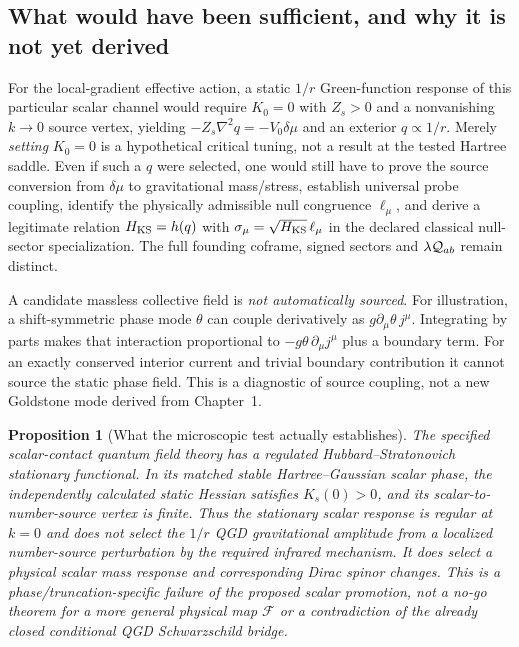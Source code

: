 \documentclass[11pt,a4paper]{article}
\newtheorem{proposition}{Proposition}[section]\newtheorem{lemma}[proposition]{Lemma}\newtheorem{definition}[proposition]{Definition}\newtheorem{remark}[proposition]{Remark}
\begin{document}
\subsection{What would have been sufficient, and why it is not yet derived}
For the local-gradient effective action, a static $1/r$ Green-function response of this particular scalar channel would require $K_0=0$ with $Z_s>0$ and a nonvanishing $k\to0$ source vertex, yielding $-Z_s\nabla^2q=-V_0\delta\mu$ and an exterior $q\propto 1/r$. Merely \emph{setting} $K_0=0$ is a hypothetical critical tuning, not a result at the tested Hartree saddle. Even if such a $q$ were selected, one would still have to prove the source conversion from $\delta\mu$ to gravitational mass/stress, establish universal probe coupling, identify the physically admissible null congruence $\ell_\mu$, and derive a legitimate relation $H_{\rm KS}=h(q)$ with $\sigma_\mu=\sqrt{H_{\rm KS}}\,\ell_\mu$ in the declared classical null-sector specialization. The full founding coframe, signed sectors and $\lambda\mathcal Q_{ab}$ remain distinct.

A candidate massless collective field is \emph{not automatically sourced}. For illustration, a shift-symmetric phase mode $\theta$ can couple derivatively as $g\partial_\mu\theta\,j^\mu$. Integrating by parts makes that interaction proportional to $-g\theta\,\partial_\mu j^\mu$ plus a boundary term. For an exactly conserved interior current and trivial boundary contribution it cannot source the static phase field. This is a diagnostic of source coupling, not a new Goldstone mode derived from Chapter~1.

\begin{proposition}[What the microscopic test actually establishes]\label{prop:qm011-verdict}
The specified scalar-contact quantum field theory has a regulated Hubbard--Stratonovich stationary functional. In its matched stable Hartree--Gaussian scalar phase, the independently calculated static Hessian satisfies $K_s(0)>0$, and its scalar-to-number-source vertex is finite. Thus the stationary scalar response is regular at $k=0$ and does \emph{not} select the $1/r$ QGD gravitational amplitude from a localized number-source perturbation by the required infrared mechanism. It does select a physical \emph{scalar mass response} and corresponding Dirac spinor changes. This is a phase/truncation-specific failure of the proposed scalar promotion, not a no-go theorem for a more general physical map $\mathcal F$ or a contradiction of the already closed \emph{conditional} QGD Schwarzschild bridge.
\end{proposition}
\end{document}

